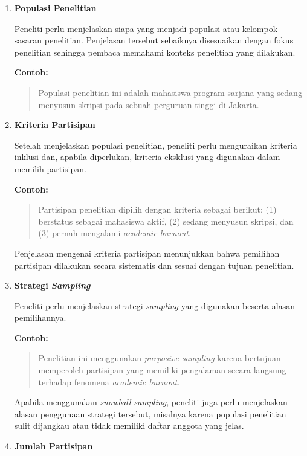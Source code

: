 \documentclass[
  indonesian,
  letterpaper,
  DIV=11,
  numbers=noendperiod]{scrreprt}
\begin{document}
\begin{enumerate}
\def\labelenumi{\arabic{enumi}.}
\item
  \textbf{Populasi Penelitian}

  Peneliti perlu menjelaskan siapa yang menjadi populasi atau kelompok
  sasaran penelitian. Penjelasan tersebut sebaiknya disesuaikan dengan
  fokus penelitian sehingga pembaca memahami konteks penelitian yang
  dilakukan.

  \textbf{Contoh:}

  \begin{quote}
  Populasi penelitian ini adalah mahasiswa program sarjana yang sedang
  menyusun skripsi pada sebuah perguruan tinggi di Jakarta.
  \end{quote}
\item
  \textbf{Kriteria Partisipan}

  Setelah menjelaskan populasi penelitian, peneliti perlu menguraikan
  kriteria inklusi dan, apabila diperlukan, kriteria eksklusi yang
  digunakan dalam memilih partisipan.

  \textbf{Contoh:}

  \begin{quote}
  Partisipan penelitian dipilih dengan kriteria sebagai berikut: (1)
  berstatus sebagai mahasiswa aktif, (2) sedang menyusun skripsi, dan
  (3) pernah mengalami \emph{academic burnout}.
  \end{quote}

  Penjelasan mengenai kriteria partisipan menunjukkan bahwa pemilihan
  partisipan dilakukan secara sistematis dan sesuai dengan tujuan
  penelitian.
\item
  \textbf{Strategi \emph{Sampling}}

  Peneliti perlu menjelaskan strategi \emph{sampling} yang digunakan
  beserta alasan pemilihannya.

  \textbf{Contoh:}

  \begin{quote}
  Penelitian ini menggunakan \emph{purposive sampling} karena bertujuan
  memperoleh partisipan yang memiliki pengalaman secara langsung
  terhadap fenomena \emph{academic burnout}.
  \end{quote}

  Apabila menggunakan \emph{snowball sampling}, peneliti juga perlu
  menjelaskan alasan penggunaan strategi tersebut, misalnya karena
  populasi penelitian sulit dijangkau atau tidak memiliki daftar anggota
  yang jelas.
\item
  \textbf{Jumlah Partisipan}


\end{enumerate}
\end{document}
